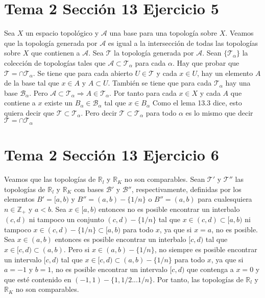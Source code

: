 \documentclass{article}
\begin{document}
\section{Tema 2 Sección 13 Ejercicio 5}
Sea $X$ un espacio topológico y $\mathcal{A}$ una base para una topología sobre $X$. Veamos que la topología generada por $\mathcal{A}$ es igual a la intersección de todas las topologías sobre $X$ que contienen a $\mathcal{A}$. Sea $\mathcal{T}$ la topología generada por $\mathcal{A}$. Sean $\{\mathcal{T}_\alpha\}$ la colección de topologías tales que $\mathcal{A}\subset \mathcal{T}_\alpha$ para cada $\alpha$. Hay que probar que $\mathcal{T}=\cap\mathcal{T}_\alpha$. Se tiene que para cada abierto $U\in\mathcal{T}$ y cada $x\in U$, hay un elemento $A$ de la base tal que $x\in A$ y $A\subset U$. También se tiene que para cada $\mathcal{T}_\alpha$ hay una base $\mathcal{B}_\alpha$. Pero $\mathcal{A}\subset \mathcal{T}_\alpha\Rightarrow A\in \mathcal{T}_\alpha$. Por tanto para cada $x\in X$ y cada $A$ que contiene a $x$ existe un $B_\alpha\in \mathcal{B}_\alpha$ tal que $x\in B_\alpha$ Como el lema 13.3 dice, esto quiera decir  que $\mathcal{T}\subset \mathcal{T}_\alpha$. Pero decir $\mathcal{T}\subset \mathcal{T}_\alpha$ para todo $\alpha$ es lo mismo que decir $\mathcal{T}=\cap \mathcal{T}_\alpha$

\section{Tema 2 Sección 13 Ejercicio 6}
Veamos que las topologías de $\mathbb{R}_l$ y $\mathbb{R}_K$ no son comparables. Sean $\mathcal{T}'$ y $\mathcal{T}''$ las topologías de $\mathbb{R}_l$ y $\mathbb{R}_K$ con bases $\mathcal{B}'$ y $\mathcal{B}''$, respectivamente, definidas por los elementos $B'=[a,b)$ y $B''=(a,b)-\{1/n\}$ o $B''=(a,b)$  para cualesquiera $n\in \mathbb{Z}_+$ y $a<b$. Sea $x\in [a,b)$ entonces no es posible encontrar un interbalo $(c,d)$ ni tampoco un conjunto $(c,d)-\{1/n\}$ tal que $x\in (c,d)\subset [a,b)$ ni tampoco $x\in (c,d)-\{1/n\}\subset [a,b)$ para todo $x$, ya que si $x=a$, no es posible. Sea $x\in (a,b)$ entonces es posible encontrar un interbalo $[c,d)$ tal que $x\in [c,d)\subset (a,b)$. Pero si $x\in(a,b)-\{1/n\}$, no siempre es posible encontrar un intervalo $[c,d)$ tal que $x\in [c,d)\subset (a,b)-\{1/n\}$ para todo $x$, ya que si $a=-1$ y $b=1$, no es posible encontrar un intervalo $[c,d)$ que contenga a $x=0$ y que esté contenido en $(-1,1)-\{1,1/2...1/n\}$. Por tanto, las topologías de $\mathbb{R}_l$ y $\mathbb{R}_K$ no son comparables.
\end{document}
